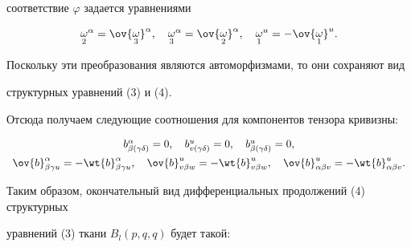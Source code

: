 соответствие $\varphi$ задается уравнениями


$$


{\crazy{\omega}{2}}^{\alpha} = \ov{\crazy{\omega}{3}}^{\alpha},


\quad {\crazy{\omega}{3}}^{\alpha} =\ov {\crazy{\omega}{2}}^{\alpha},


\quad {\crazy{\omega}{1}}^{u}=-\ov{\crazy{\omega}{1}}^{u}.


$$





Поскольку эти преобразования являются автоморфизмами, то они сохраняют вид


структурных уравнений (3) и (4).


Отсюда получаем следующие соотношения для компонентов тензора кривизны:


\begin{equation}


\begin{array}{c}


b^{\alpha}_{\beta (\gamma \delta)}=0, \quad b^{u}_{v (\gamma \delta)}=0,


\quad b^{u}_{\beta (\gamma \delta)}=0,\\[2mm]


\ov{b}^{\alpha}_{\beta \gamma u}=-\wt{b}^{\alpha}_{\beta \gamma u},


\quad \ov{b}^{u}_{v \beta w}=-\wt{b}^{u}_{v \beta w},


\quad \ov{b}^{u}_{\alpha \beta v}=-\wt{b}^{u}_{\alpha \beta v}.


\end{array}


\end{equation}





Таким образом, окончательный вид дифференциальных продолжений (4) структурных


уравнений (3) ткани $B_{l}(p,q,q)$ будет такой:


